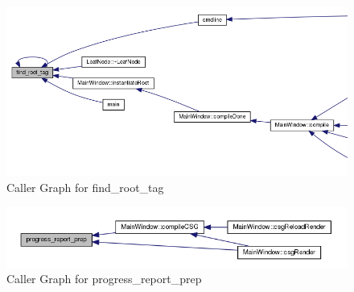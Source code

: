 \begin{figure}
\centering
\includegraphics[width=\linewidth]{images/rootTag}
\caption{Caller Graph for find\_root\_tag}
\label{fig:findRootTag}
\end{figure}

\begin{figure}
\centering
\includegraphics[width=\linewidth]{images/Prog}
\caption{Caller Graph for progress\_report\_prep}
\label{fig:prog}
\end{figure}
